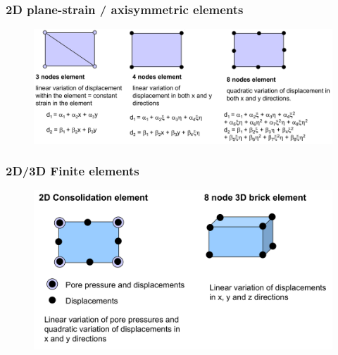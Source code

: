 \documentclass[notes]{beamer}
\begin{document}
\begin{frame}
\frametitle{2D plane-strain / axisymmetric elements}
\begin{figure}[ht]
	\centering
	\includegraphics[width=\textwidth]{figs/2d-fe-elements.png}
\end{figure}
\end{frame}

\begin{frame}
\frametitle{2D/3D Finite elements}
\begin{figure}[ht]
	\centering
	\includegraphics[width=\textwidth]{figs/2d-3d-elements.png}
\end{figure}
\end{frame}
\end{document}
